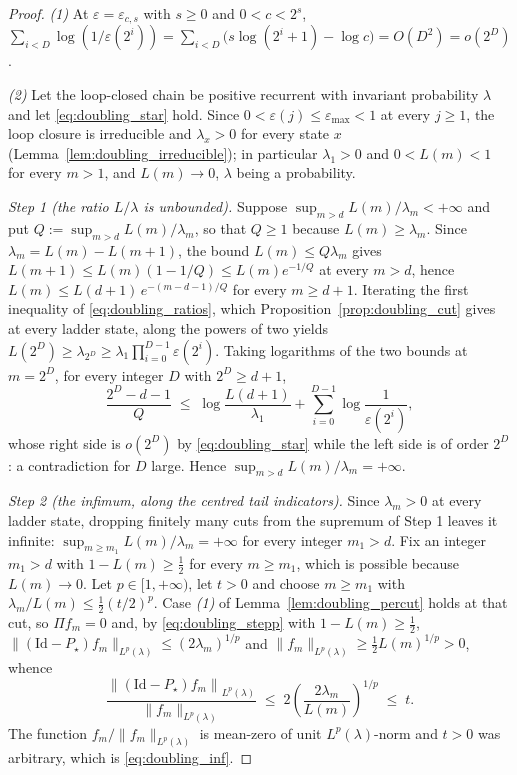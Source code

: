 \begin{proof}
\emph{(1)} At $\varepsilon=\varepsilon_{c,s}$ with $s\geq0$ and $0<c<2^s$,
$\sum_{i<D}\log(1/\varepsilon(2^i))=\sum_{i<D}\bigl(s\log(2^i+1)-\log c\bigr)=O(D^2)=o(2^D)$.

\emph{(2)} Let the loop-closed chain be positive recurrent with invariant probability
$\lambda$ and let \eqref{eq:doubling_star} hold. Since
$0<\varepsilon(j)\leq\varepsilon_{\max}<1$ at every $j\geq1$, the loop closure is
irreducible and $\lambda_x>0$ for every state $x$ (Lemma~\ref{lem:doubling_irreducible}); in
particular $\lambda_1>0$ and
$0<L(m)<1$ for every $m>1$, and $L(m)\rightarrow0$, $\lambda$ being a probability.

\emph{Step 1 (the ratio $L/\lambda$ is unbounded).} Suppose $\sup_{m>d}L(m)/\lambda_m<+\infty$
and put $Q:=\sup_{m>d}L(m)/\lambda_m$, so that $Q\geq1$ because $L(m)\geq\lambda_m$. Since
$\lambda_m=L(m)-L(m+1)$, the bound $L(m)\leq Q\lambda_m$ gives
$L(m+1)\leq L(m)(1-1/Q)\leq L(m)e^{-1/Q}$ at every $m>d$, hence
$L(m)\leq L(d+1)\,e^{-(m-d-1)/Q}$ for every $m\geq d+1$. Iterating the first inequality of
\eqref{eq:doubling_ratios}, which Proposition~\ref{prop:doubling_cut} gives at every ladder
state, along the powers of two yields
$L(2^D)\geq\lambda_{2^D}\geq\lambda_1\prod_{i=0}^{D-1}\varepsilon(2^i)$. Taking logarithms of
the two bounds at $m=2^D$, for every integer $D$ with $2^D\geq d+1$,
\begin{equation}
    \frac{2^D-d-1}{Q}\;\leq\;\log\frac{L(d+1)}{\lambda_1}+\sum_{i=0}^{D-1}\log\frac1{\varepsilon(2^i)},
\end{equation}
whose right side is $o(2^D)$ by \eqref{eq:doubling_star} while the left side is of order
$2^D$: a contradiction for $D$ large. Hence $\sup_{m>d}L(m)/\lambda_m=+\infty$.

\emph{Step 2 (the infimum, along the centred tail indicators).} Since $\lambda_m>0$ at every
ladder state, dropping finitely many cuts from the supremum of Step 1 leaves it infinite:
$\sup_{m\geq m_1}L(m)/\lambda_m=+\infty$ for every integer $m_1>d$. Fix an integer $m_1>d$
with $1-L(m)\geq\tfrac12$ for every $m\geq m_1$, which is possible because
$L(m)\rightarrow0$. Let $p\in[1,+\infty)$, let $t>0$ and choose $m\geq m_1$ with
$\lambda_m/L(m)\leq\tfrac12(t/2)^p$. Case \emph{(1)} of Lemma~\ref{lem:doubling_percut} holds
at that cut, so $\Pi f_m=0$ and, by \eqref{eq:doubling_stepp} with $1-L(m)\geq\tfrac12$,
$\|(\mathrm{Id}-P_\star)f_m\|_{L^p(\lambda)}\leq(2\lambda_m)^{1/p}$ and
$\|f_m\|_{L^p(\lambda)}\geq\tfrac12L(m)^{1/p}>0$, whence
\begin{equation}
    \frac{\left\|\left(\mathrm{Id}-P_\star\right)f_m\right\|_{L^p(\lambda)}}{\|f_m\|_{L^p(\lambda)}}
    \;\leq\;2\left(\frac{2\lambda_m}{L(m)}\right)^{1/p}\;\leq\;t .
\end{equation}
The function $f_m/\|f_m\|_{L^p(\lambda)}$ is mean-zero of unit $L^p(\lambda)$-norm and $t>0$
was arbitrary, which is \eqref{eq:doubling_inf}.


\end{proof}
